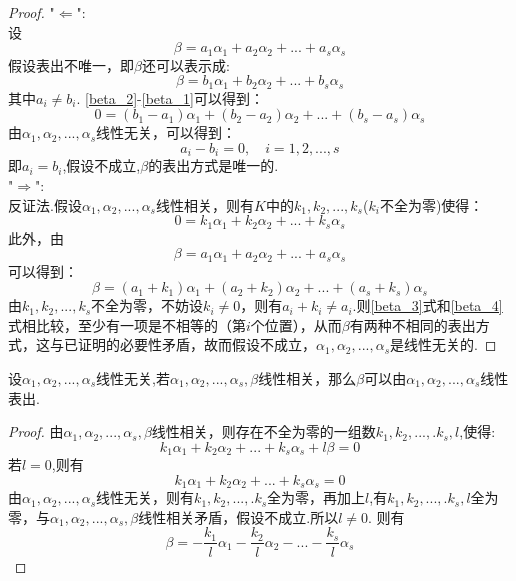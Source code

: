 \documentclass[blue,normal,cn]{elegantnote}
\begin{document}
\begin{proof}
    "$\Leftarrow$":\\
    设
    \begin{equation}
    β=a_1α_1+a_2α_2+...+a_sα_s  \label{beta_1}
    \end{equation}
    假设表出不唯一，即$β$还可以表示成:
    \begin{equation}
    β=b_1 α_1+b_2 α_2+...+b_s α_s  \label{beta_2}
    \end{equation}
    其中$a_i ≠ b_i$.
    \eqref{beta_2}-\eqref{beta_1}可以得到：
    \begin{equation*}
        0=(b_1-a_1)α_1+(b_2-a_2)α_2+...+(b_s-a_s)α_s 
    \end{equation*}
    由$α_1,α_2,...,α_s$线性无关，可以得到：
    \begin{equation*}
        a_i-b_i=0,\quad i=1,2,...,s
    \end{equation*}
    即$a_i=b_i$,假设不成立,$β$的表出方式是唯一的.\\
    "$\Rightarrow$":\\
    反证法.假设$α_1,α_2,...,α_s$线性相关，则有$K$中的$k_1,k_2,...,k_s$($k_i$不全为零)使得：
    \begin{equation*}
        0=k_1α_1+k_2α_2+...+k_sα_s 
    \end{equation*}
    此外，由
    \begin{equation}
    β=a_1α_1+a_2α_2+...+a_sα_s  \label{beta_3}
    \end{equation}
    可以得到：
    \begin{equation}
        β=(a_1+k_1)α_1+(a_2+k_2)α_2+...+(a_s+k_s)α_s  \label{beta_4}
    \end{equation}
    由$k_1,k_2,...,k_s$不全为零，不妨设$k_i ≠ 0$，则有$a_i+k_i ≠ a_i$.则\eqref{beta_3}式和\eqref{beta_4}式相比较，至少有一项是不相等的（第$i$个位置），从而$β$有两种不相同的表出方式，这与已证明的必要性矛盾，故而假设不成立，$α_1,α_2,...,α_s$是线性无关的.
\end{proof}

\begin{proposition}
    设$α_1,α_2,...,α_s$线性无关,若$α_1,α_2,...,α_s,β$线性相关，那么$β$可以由$α_1,α_2,...,α_s$线性表出.
\end{proposition}
\begin{proof}
    由$α_1,α_2,...,α_s,β$线性相关，则存在不全为零的一组数$k_1,k_2,...,.k_s,l$,使得:
    \begin{equation*}
        k_1 α_1+k_2 α_2+...+k_s α_s+l β =0 
    \end{equation*}
    若$l=0$,则有
    \begin{equation*}
        k_1 α_1+k_2 α_2+...+k_s α_s=0 
    \end{equation*}
    由$α_1,α_2,...,α_s$线性无关，则有$k_1,k_2,...,.k_s$全为零，再加上$l$,有$k_1,k_2,...,.k_s,l$全为零，与$α_1,α_2,...,α_s,β$线性相关矛盾，假设不成立.所以$l\neq 0$.
    则有
    \begin{equation*}
         β =-\frac{k_1}{l} α_1-\frac{k_2}{l} α_2-...-\frac{k_s}{l} α_s 
    \end{equation*}
\end{proof}
\end{document}
